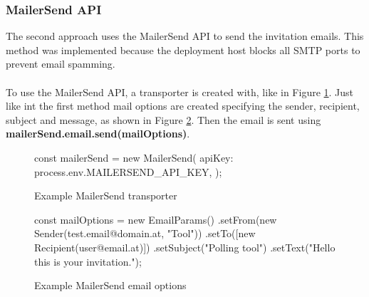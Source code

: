\documentclass[a4paper,12pt]{report}
\begin{document}
\subsubsection{MailerSend API}
The second approach uses the MailerSend API to send the invitation emails. This method was implemented because the deployment host blocks all SMTP ports to prevent email spamming. \\\\
To use the MailerSend API, a transporter is created with, like in Figure \ref{fig:example-mailersend-transporter-creation}. Just like int the first method mail options are created specifying the sender, recipient, subject and message, as shown in Figure \ref{fig:example-mail-options-mailersend}. Then the email is sent using \textbf{mailerSend.email.send(mailOptions)}.
\begin{figure}[H]
	\begin{code}
		const mailerSend = new MailerSend({
			apiKey: process.env.MAILERSEND_API_KEY,
		});
	\end{code}
	\caption{Example MailerSend transporter}
	\label{fig:example-mailersend-transporter-creation}
\end{figure}
\begin{figure}[H]
	\begin{code}
		const mailOptions = new EmailParams()
		.setFrom(new Sender(test.email@domain.at, "Tool"))
		.setTo([new Recipient(user@email.at)])
		.setSubject("Polling tool")
		.setText("Hello this is your invitation.");
	\end{code}
	\caption{Example MailerSend email options}
	\label{fig:example-mail-options-mailersend}
\end{figure}
\end{document}
